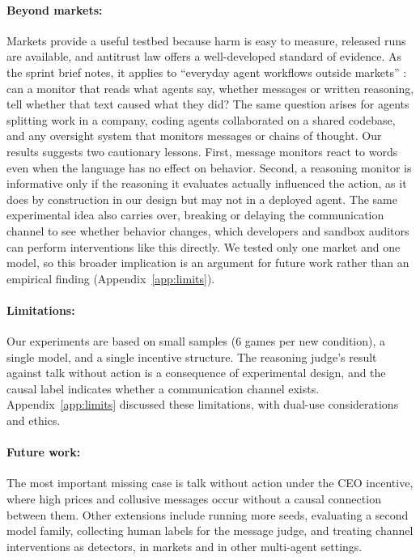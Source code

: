 \documentclass[11pt]{article}
\begin{document}
\paragraph{Beyond markets:} Markets provide a useful testbed because harm is easy to measure, released runs are available, and antitrust law offers a well-developed standard of evidence. As the sprint brief notes, it applies to ``everyday agent workflows outside markets'' \citep{apart2026}: can a monitor that reads what agents say, whether messages or written reasoning, tell whether that text caused what they did? The same question arises for agents splitting work in a company, coding agents collaborated on a shared codebase, and any oversight system that monitors messages or chains of thought. Our results suggests two cautionary lessons. First, message monitors react to words even when the language has no effect on behavior. Second, a reasoning monitor is informative only if the reasoning it evaluates actually influenced the action, as it does by construction in our design but may not in a deployed agent. The same experimental idea also carries over, breaking or delaying the communication channel to see whether behavior changes, which developers and sandbox auditors can perform interventions like this directly. We tested only one market and one model, so this broader implication is an argument for future work rather than an empirical finding (Appendix~\ref{app:limits}).

\paragraph{Limitations:} Our experiments are based on small samples (6 games per new condition), a single model, and a single incentive structure. The reasoning judge's result against talk without action is a consequence of experimental design, and the causal label indicates whether a communication channel exists. Appendix~\ref{app:limits} discussed these limitations, with dual-use considerations and ethics.

\paragraph{Future work:} The most important missing case is talk without action under the CEO incentive, where high prices and collusive messages occur without a causal connection between them. Other extensions include running more seeds, evaluating a second model family, collecting human labels for the message judge, and treating channel interventions as detectors, in markets and in other multi-agent settings.
\end{document}
